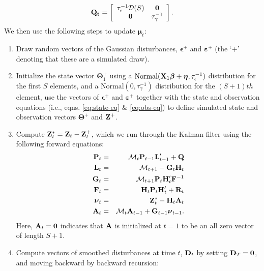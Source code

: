 \documentclass[12pt,fleqn]{article}
\begin{document}
\begin{flushleft}
\begin{eqnarray*}
  \bf{Q}_t = \left[  \begin{array}{cc} \tau_\epsilon^{-1} \mathcal{D}(S) & {\bf 0} \\ {\bf 0} & \tau_\gamma^{-1} \end{array} \right].
\end{eqnarray*}
We then use the following steps to update $\boldsymbol{\mu}_t$:
\begin{enumerate}
  \item Draw random vectors of the Gaussian disturbances, $\boldsymbol{\epsilon}^+$ and $\boldsymbol{\varepsilon}^+$ (the `+' denoting that these are a simulated draw).
  \item Initialize the state vector $\boldsymbol{\Theta}_1^+$ using a $\textrm{Normal}({\bf X}_1 \boldsymbol{\beta} + \boldsymbol{\eta}, \tau_\epsilon^{-1})$ distribution for the first $S$ elements, and a $\textrm{Normal}(0,\tau_\gamma^{-1})$ distribution for the $(S+1)th$ element, use the vectors of $\boldsymbol{\epsilon}^+$ and $\boldsymbol{\varepsilon}^+$ together with the state and observation equations (i.e., eqns. \ref{eq:state-eq} \& \ref{eq:obs-eq}) to define simulated state and observation vectors $\boldsymbol{\Theta}^+$ and ${\bf Z}^+$.
  \item Compute ${\bf Z}_t^* = {\bf Z}_t - {\bf Z}_t^+$, which we run through the Kalman filter using the following
      forward equations:
      \begin{eqnarray*}
        {\bf P}_t & = & \mathcal{M}_t {\bf P}_{t-1} {\bf L}_{t-1}^\prime + {\bf Q} \\
        {\bf L}_t & = & \mathcal{M}_{t+1} - {\bf G}_{t} {\bf H}_{t} \\
        {\bf G}_t & = & \mathcal{M}_{t+1} {\bf P}_t {\bf H}_t^\prime {\bf F}^{-1} \\
        {\bf F}_t & = & {\bf H}_t {\bf P}_t {\bf H}_t^\prime + {\bf R}_t \\
        \boldsymbol{\nu}_t & = & {\bf Z}_t^* - {\bf H}_t {\bf A}_t \\
        {\bf A}_t & = & \mathcal{M}_t {\bf A}_{t-1} + {\bf G}_{t-1} \boldsymbol{\nu}_{t-1}.
      \end{eqnarray*}
      Here, ${\bf A}_t = {\bf 0}$ indicates that ${\bf A}$ is initialized at $t=1$ to be an all zero vector of length $S+1$.
  \item Compute vectors of smoothed disturbances at time $t$, ${\bf D}_t$ by setting ${\bf D}_T ={\bf 0}$, and moving backward by backward recursion:
      \begin{eqnarray*}

\end{eqnarray*}
\end{enumerate}
\end{flushleft}
\end{document}
